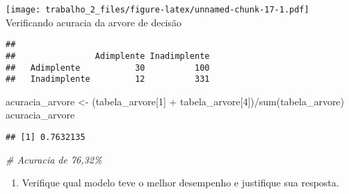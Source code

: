 \documentclass[
]{article}
\newenvironment{Shaded}{\begin{snugshade}}{\end{snugshade}}
\newcommand{\AttributeTok}[1]{\textcolor[rgb]{0.77,0.63,0.00}{#1}}
\newcommand{\CommentTok}[1]{\textcolor[rgb]{0.56,0.35,0.01}{\textit{#1}}}
\newcommand{\DecValTok}[1]{\textcolor[rgb]{0.00,0.00,0.81}{#1}}
\newcommand{\FunctionTok}[1]{\textcolor[rgb]{0.00,0.00,0.00}{#1}}
\newcommand{\NormalTok}[1]{#1}
\newcommand{\OtherTok}[1]{\textcolor[rgb]{0.56,0.35,0.01}{#1}}
\newcommand{\SpecialCharTok}[1]{\textcolor[rgb]{0.00,0.00,0.00}{#1}}
\newcommand{\StringTok}[1]{\textcolor[rgb]{0.31,0.60,0.02}{#1}}
\providecommand{\tightlist}{%
  \setlength{\itemsep}{0pt}\setlength{\parskip}{0pt}}
\begin{document}
\texttt{[image: trabalho\_2\_files/figure-latex/unnamed-chunk-17-1.pdf]}
Verificando acuracia da arvore de decisão

\begin{Shaded}
\end{Shaded}

\begin{verbatim}
##               
##                Adimplente Inadimplente
##   Adimplente           30          100
##   Inadimplente         12          331
\end{verbatim}

\begin{Shaded}
\begin{Highlighting}[]
\NormalTok{acuracia\_arvore }\OtherTok{\textless{}{-}}\NormalTok{ (tabela\_arvore[}\DecValTok{1}\NormalTok{] }\SpecialCharTok{+}\NormalTok{ tabela\_arvore[}\DecValTok{4}\NormalTok{])}\SpecialCharTok{/}\FunctionTok{sum}\NormalTok{(tabela\_arvore)}
\NormalTok{acuracia\_arvore}
\end{Highlighting}
\end{Shaded}

\begin{verbatim}
## [1] 0.7632135
\end{verbatim}

\begin{Shaded}
\begin{Highlighting}[]
\CommentTok{\# Acuracia de 76,32\%}
\end{Highlighting}
\end{Shaded}

\begin{enumerate}
\def\labelenumi{\alph{enumi})}
\setcounter{enumi}{2}
\tightlist
\item
  Verifique qual modelo teve o melhor desempenho e justifique sua
  resposta.
\end{enumerate}
\end{document}
